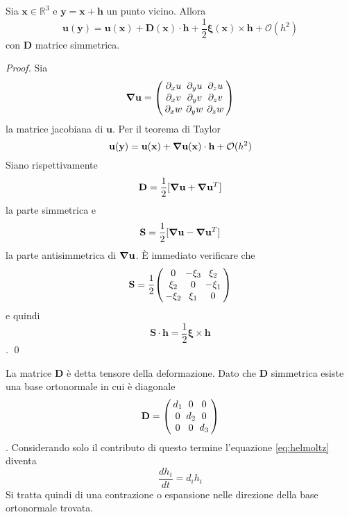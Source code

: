 \begin{theorem}
Sia $\mathbf{x} \in \mathbb{R}^3$ e $\mathbf{y} = \mathbf{x} + \mathbf{h}$ un punto vicino. Allora 
\begin{equation}\label{eq:helmoltz}
\mathbf{u}(\mathbf{y}) = \mathbf{u}(\mathbf{x}) + \mathbf{D}(\mathbf{x}) \cdot \mathbf{h} + \frac{1}{2} \boldsymbol{\xi}(\mathbf{x}) \times \mathbf{h} + \mathcal{O} ( h^2)
\end{equation}
con $\mathbf{D}$ matrice simmetrica.
\end{theorem}
\begin{proof}
Sia
\begin{equation}
\Nabla\mathbf{u}={\setlength\arraycolsep{2pt} 
\left(\begin{array}{ccc} 
\partial_x u&  \partial_y u &\partial_z u\\ 
\partial_x v&  \partial_y v &\partial_z v\\ 
\partial_x w&  \partial_y w &\partial_z w\\
\end{array}\right) 
}
\end{equation}
la matrice jacobiana di $\mathbf{u}$.
Per il teorema di Taylor
$$\mathbf{u}(\mathbf{y}) = \mathbf{u}(\mathbf{x}) + \boldsymbol{\nabla}\mathbf{u}(\mathbf{x}) \cdot \mathbf{h} + \mathcal{O} ( h^2)$$
Siano rispettivamente
$$\mathbf{D} = \frac{1}{2} [ \boldsymbol{\nabla}\mathbf{u} + \boldsymbol{\nabla}\mathbf{u} ^T]$$
la parte simmetrica e
$$\mathbf{S} = \frac{1}{2} [ \boldsymbol{\nabla}\mathbf{u} - \boldsymbol{\nabla}\mathbf{u} ^T]$$
la parte antisimmetrica di $ \boldsymbol{\nabla}\mathbf{u}$.
\`E immediato verificare che
\begin{equation}
\mathbf{S}=\frac{1}{2}{\setlength\arraycolsep{2pt} 
\left(\begin{array}{ccc} 
0&  -\xi_3 &\xi_2\\ 
\xi_2&  0 &-\xi_1\\ 
-\xi_2&  \xi_1 &0\\
\end{array}\right) 
}
\end{equation}
e quindi
$$\mathbf{S} \cdot \mathbf{h} = \frac{1}{2} \boldsymbol{\xi} \times \mathbf{h}$$.
\qed%
\end{proof}

La matrice $\mathbf{D}$ è detta tensore della deformazione. Dato che $\mathbf{D}$ simmetrica esiste una base ortonormale in cui è diagonale
\begin{equation}
\mathbf{D}={\setlength\arraycolsep{2pt} 
\left(\begin{array}{ccc} 
d_1 & 0 & 0 \\ 
0 & d_2 & 0 \\ 
0 & 0 & d_3 \\
\end{array}\right) 
}
\end{equation}.
Considerando solo il contributo di questo termine l'equazione \ref{eq:helmoltz} diventa 
$$\frac{d h_i}{dt} = d_i h_i$$
Si tratta quindi di una contrazione o espansione nelle direzione della base ortonormale trovata.

